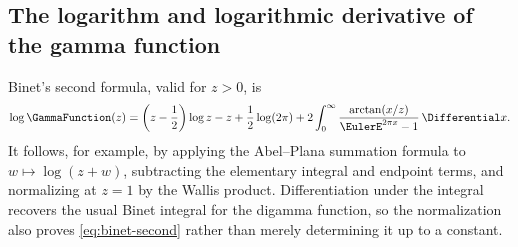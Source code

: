 \documentclass[11pt,a4paper,oneside,openany]{book}
\theoremstyle{definition}
\theoremstyle{remark}
\begin{document}
\subsection{The logarithm and logarithmic derivative of the gamma function}
Binet's second formula, valid for $z>0$, is
\begin{equation}
\label{eq:binet-second}
 \log\GammaFunction(z)
 =\left(z-\frac12\right)\log z-z+\frac12\log(2\pi)
 +2\int_0^\infty\frac{\arctan(x/z)}{\EulerE^{2\pi x}-1}\,\Differential x.
\end{equation}
It follows, for example, by applying the Abel--Plana summation formula to
$w\mapsto\log(z+w)$, subtracting the elementary integral and endpoint terms, and
normalizing at $z=1$ by the Wallis product.  Differentiation under the integral
recovers the usual Binet integral for the digamma function, so the normalization
also proves \eqref{eq:binet-second} rather than merely determining it up to a
constant.
\end{document}
